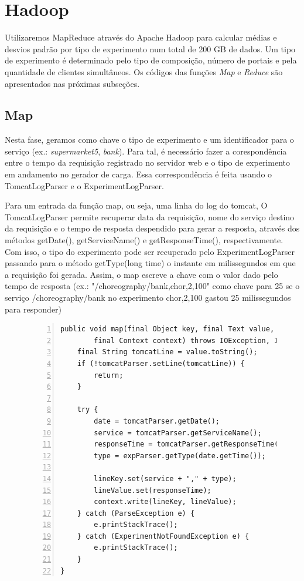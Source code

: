 \documentclass[brazil, a4paper,12pt]{article}
\begin{document}
\section{Hadoop}

Utilizaremos MapReduce através do Apache Hadoop para calcular médias e desvios padrão por tipo de experimento num total de 200 GB de dados. Um tipo de experimento é determinado pelo tipo de composição, número de portais e pela quantidade de clientes simultâneos. Os códigos das funções \emph{Map} e \emph{Reduce} são apresentados nas próximas subseções.

\subsection{Map}

Nesta fase, geramos como chave o tipo de experimento e um identificador para o serviço (ex.: \emph{supermarket5}, \emph{bank}). Para tal, é necessário fazer a corespondência entre o tempo da requisição registrado no servidor web e o tipo de experimento em andamento no gerador de carga. Essa correspondência é feita usando o TomcatLogParser e o ExperimentLogParser.

Para um entrada da função map, ou seja, uma linha do log do tomcat, O TomcatLogParser permite recuperar data da requisição, nome do serviço destino da requisição e o tempo de resposta despendido para gerar a resposta, através dos métodos getDate(), getServiceName() e getResponseTime(), respectivamente. Com isso, o tipo do experimento pode ser recuperado pelo ExperimentLogParser passando para o método getType(long time) o instante em milissegundos em que a requisição foi gerada. Assim, o map escreve a chave com o valor dado pelo tempo de resposta (ex.: "/choreography/bank,chor,2,100" como chave para 25 se o serviço /choreography/bank no experimento chor,2,100 gastou 25 milissegundos para responder) 

\begin{figure} [!htb]
\begin{center}
\footnotesize
\begin{lstlisting}[numbers=left]
public void map(final Object key, final Text value,
		final Context context) throws IOException, InterruptedException {
	final String tomcatLine = value.toString();
	if (!tomcatParser.setLine(tomcatLine)) {
		return;
	}

	try {
		date = tomcatParser.getDate();
		service = tomcatParser.getServiceName();
		responseTime = tomcatParser.getResponseTime();
		type = expParser.getType(date.getTime());

		lineKey.set(service + "," + type);
		lineValue.set(responseTime);
		context.write(lineKey, lineValue);
	} catch (ParseException e) {
		e.printStackTrace();
	} catch (ExperimentNotFoundException e) {
		e.printStackTrace();
	}
}
\end{lstlisting}
\end{center}
\end{figure}
\end{document}
